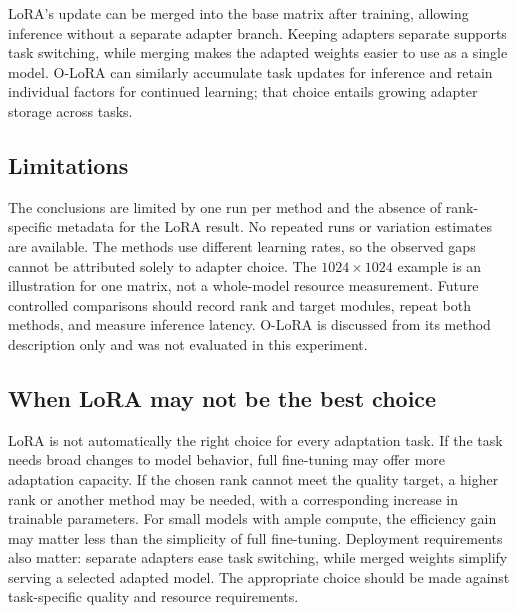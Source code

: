 LoRA's update can be merged into the base matrix after training, allowing
inference without a separate adapter branch. Keeping adapters separate
supports task switching, while merging makes the adapted weights easier
to use as a single model. O-LoRA can similarly accumulate task updates
for inference and retain individual factors for continued learning; that
choice entails growing adapter storage across tasks.

\subsection{Limitations}

The conclusions are limited by one run per method and the absence of
rank-specific metadata for the LoRA result. No repeated runs or
variation estimates are available. The methods use different learning
rates, so the observed gaps cannot be attributed solely to adapter
choice. The $1024\times1024$ example is an
illustration for one matrix, not a whole-model resource measurement.
Future controlled comparisons should record rank and target modules,
repeat both methods, and measure inference latency. O-LoRA
is discussed from its method description only and was not evaluated in
this experiment.

\subsection{When LoRA may not be the best choice}

LoRA is not automatically the right choice for every adaptation task. If
the task needs broad changes to model behavior, full fine-tuning may offer
more adaptation capacity. If the chosen rank cannot meet the quality
target, a higher rank or another method may be needed, with a corresponding
increase in trainable parameters. For small models with ample compute, the
efficiency gain may matter less than the simplicity of full fine-tuning.
Deployment requirements also matter: separate adapters ease task
switching, while merged weights simplify serving a selected adapted model.
The appropriate choice should be made against task-specific quality and
resource requirements.
